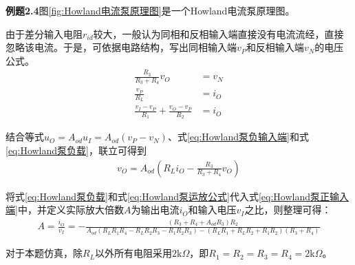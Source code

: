 \documentclass[./测控三级项目.tex]{subfiles} %
\begin{document}
			\textbf{例题2.4}\qquad 图\ref{fig:Howland电流泵原理图}是一个Howland电流泵原理图。\par
			由于差分输入电阻$r_{id}$较大，一般认为同相和反相输入端直接没有电流流经，直接忽略该电流。于是，可依据电路结构，写出同相输入端$v_P$和反相输入端$v_N$的电压公式。
			\begin{align}
				\frac{R_3}{R_3+R_4}v_O&=v_N	\label{eq:Howland泵负输入端}\\
				\frac{v_P}{R_L}&=i_O		\label{eq:Howland泵负载}\\
				\frac{v_I-v_P}{R_1}+\frac{v_O-v_P}{R_2}&=i_O\label{eq:Howland泵正输入端}
			\end{align}\par
			结合等式$u_O=A_{od}u_I=A_{od}(v_P-v_N)$、式\ref{eq:Howland泵负输入端}和式\ref{eq:Howland泵负载}，联立可得到
			\begin{align}
				v_O=A_{od}(R_Li_O-\frac{R_3}{R_3+R_4}v_O)
				\label{eq:Howland泵运放公式}
			\end{align}\par
			将式\ref{eq:Howland泵负载}和式\ref{eq:Howland泵运放公式}代入式\ref{eq:Howland泵正输入端}中，并定义实际放大倍数$A$为输出电流$i_O$和输入电压$v_I$之比，则整理可得：
			\begin{align}
				A=\frac{i_O}{v_I}=-\frac{(R_3+R_4+A_{od}R_3)R_2}{A_{od}(R_LR_1R_4-R_LR_2R_3-R_1R_2R_3)-(R_LR_1+R_LR_2+R_1R_2)(R_3+R_4)}
			\end{align}\par
			对于本题仿真，除$R_L$以外所有电阻采用$2$k$\Omega$，即$R_1=R_2=R_3=R_4=2$k$\Omega$。
\end{document}
